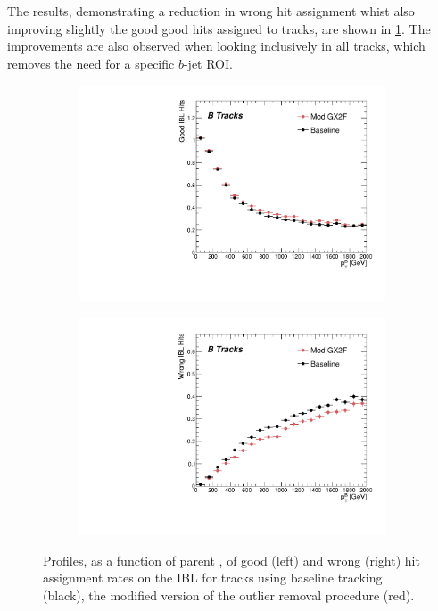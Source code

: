 The results, demonstrating a reduction in wrong hit assignment whist also improving slightly the good good hits assigned to tracks, are shown in \cref{fig:gx2f_opt_hits}. The improvements are also observed when looking inclusively in all tracks, which removes the need for a specific $b$-jet ROI.
%
\begin{figure}[!htbp]
    \centering
    \begin{subfigure}{.48\textwidth}
      \centering
      \includegraphics[width=\textwidth]{chapters/3.tracking/figs/p_nGoodHitsIBL_pTB_From_B.pdf}
    \end{subfigure}%
    \begin{subfigure}{.48\textwidth}
      \centering
      \includegraphics[width=\textwidth]{chapters/3.tracking/figs/p_nWrongHitsIBL_pTB_From_B.pdf}
    \end{subfigure}
    \caption{Profiles, as a function of parent \bhadron \pt, of good (left) and wrong (right) hit assignment rates on the IBL for tracks using baseline tracking (black), the modified version of the outlier removal procedure (red).}
    \label{fig:gx2f_opt_hits}
\end{figure}
